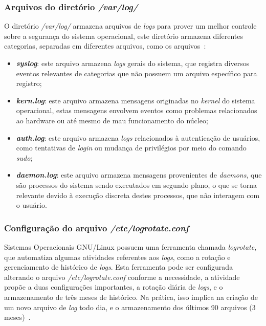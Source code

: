\documentclass[
    12pt,				%
    oneside,   	        %
    a4paper,			%
    english,			%
    french,				%
    spanish,			%
    brazil,				%
    ]{pacotes/abntex2}
\begin{document}
\subsubsection{Arquivos do diretório \textit{/var/log/}}
O diretório \textit{/var/log/} armazena arquivos de \textit{logs} para prover um melhor controle sobre a segurança do sistema operacional, este diretório armazena diferentes categorias, separadas em diferentes arquivos, como os arquivos~\cite{negus2012}:

\begin{itemize}
    \item \textbf{\textit{syslog}}: este arquivo armazena \textit{logs} gerais do sistema, que registra diversos eventos relevantes de categorias que não possuem um arquivo específico para registro;
    \item \textbf{\textit{kern.log}}: este arquivo armazena mensagens originadas no \textit{kernel} do sistema operacional, estas mensagens envolvem eventos como problemas relacionados ao hardware ou até mesmo de mau funcionamento do núcleo;
    \item \textbf{\textit{auth.log}}: este arquivo armazena \textit{logs} relacionados à autenticação de usuários, como tentativas de \textit{login} ou mudança de privilégios por meio do comando \textit{sudo};
    \item \textbf{\textit{daemon.log}}: este arquivo armazena mensagens provenientes de \textit{daemons}, que são processos do sistema sendo executados em segundo plano, o que se torna relevante devido à execução discreta destes processos, que não interagem com o usuário.
\end{itemize}

\subsubsection{Configuração do arquivo \textit{/etc/logrotate.conf}}
Sistemas Operacionais GNU/Linux possuem uma ferramenta chamada \textit{logrotate}, que automatiza algumas atividades referentes aos \textit{logs}, como a rotação e gerenciamento de histórico de \textit{logs}. Esta ferramenta pode ser configurada alterando o arquivo \textit{/etc/logrotate.conf} conforme a necessidade, a atividade propõe a duas configurações importantes, a rotação diária de \textit{logs}, e o armazenamento de três meses de histórico. Na prática, isso implica na criação de um novo arquivo de \textit{log} todo dia, e o armazenamento dos últimos 90 arquivos (3 meses)~\cite{guiafocaSegurança}.
\end{document}
